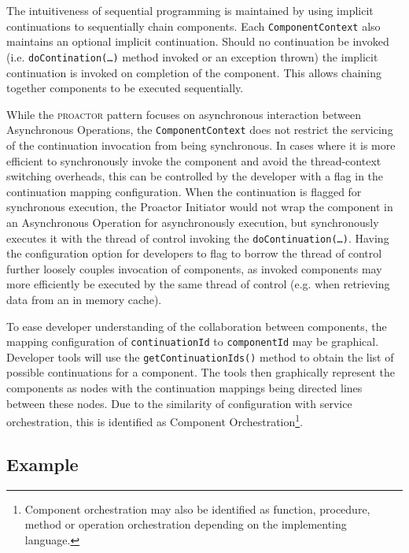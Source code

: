 \documentclass[prodmode]{style/acmlarge}
\begin{document}
The intuitiveness of sequential programming is maintained by using implicit
continuations \cite{continuations} to sequentially chain components.  Each
\texttt{ComponentContext} also maintains an optional implicit continuation. 
Should no continuation be invoked (i.e. \texttt{doContination(\ldots)} method
invoked or an exception thrown) the implicit continuation is invoked on
completion of the component.  This allows chaining together components to be
executed sequentially.

While the \textsc{proactor} pattern focuses on asynchronous interaction between
Asynchronous Operations, the \texttt{ComponentContext} does not restrict the
servicing of the continuation invocation from being synchronous.  In cases where
it is more efficient to synchronously invoke the component and avoid the
thread-context switching overheads, this can be controlled by the developer with
a flag in the continuation mapping configuration.  When the continuation is
flagged for synchronous execution, the Proactor Initiator would not wrap the
component in an Asynchronous Operation for asynchronously execution, but
synchronously executes it with the thread of control invoking the
\texttt{doContinuation(\ldots)}.  Having the configuration option for developers
to flag to borrow the thread of control further loosely couples invocation of
components, as invoked components may more efficiently be executed by the same
thread of control (e.g. when retrieving data from an in memory cache).

To ease developer understanding of the collaboration between components, the
mapping configuration of \texttt{continuationId}  to \texttt{componentId} may be
graphical.  Developer tools will use the \texttt{getContinuationIds()} method to
obtain the list of possible continuations for a component.  The tools then
graphically represent the components as nodes with the continuation mappings
being directed lines between these nodes.  Due to the similarity of
configuration with service orchestration, this is identified as Component
Orchestration\footnote{Component orchestration may also be identified as
function, procedure, method or operation orchestration depending on the
implementing language.}.


\subsection{Example}
\end{document}
